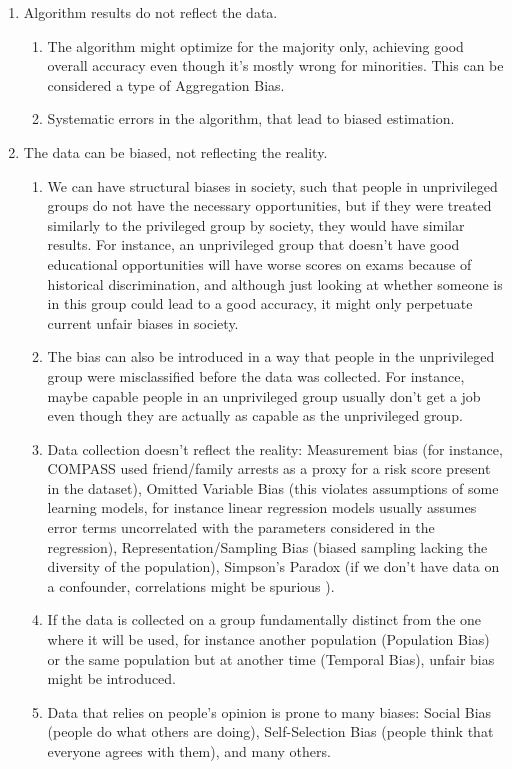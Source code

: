 \documentclass[conference]{IEEEtran}
\begin{document}
\begin{enumerate}
\item Algorithm results do not reflect the data.
    \begin{enumerate}
    \item The algorithm might optimize for the majority only, achieving good overall accuracy even though it's mostly wrong for minorities. This can be considered a type of Aggregation Bias.
    \item Systematic errors in the algorithm, that lead to biased estimation.
    \end{enumerate}
\item The data can be biased, not reflecting the reality.
    \begin{enumerate}
    \item We can have structural biases in society, such that people in unprivileged groups do not have the necessary opportunities, but if they were treated similarly to the privileged group by society, they would have similar results. For instance, an unprivileged group that doesn't have good educational opportunities will have worse scores on exams because of historical discrimination, and although just looking at whether someone is in this group could lead to a good accuracy, it might only perpetuate current unfair biases in society.
    \item The bias can also be introduced in a way that people in the unprivileged group were misclassified before the data was collected. For instance, maybe capable people in an unprivileged group usually don't get a job even though they are actually as capable as the unprivileged group.
    \item Data collection doesn't reflect the reality: Measurement bias (for instance, COMPASS used friend/family arrests as a proxy for a risk score present in the dataset), Omitted Variable Bias (this violates assumptions of some learning models, for instance linear regression models usually assumes error terms uncorrelated with the parameters considered in the regression), Representation/Sampling Bias (biased sampling lacking the diversity of the population), Simpson's Paradox (if we don't have data on a confounder, correlations might be spurious \cite{Causality}).
    \item If the data is collected on a group fundamentally distinct from the one where it will be used, for instance another population (Population Bias) or the same population but at another time (Temporal Bias), unfair bias might be introduced.
    \item Data that relies on people's opinion is prone to many biases: Social Bias (people do what others are doing), Self-Selection Bias (people think that everyone agrees with them), and many others.

\end{enumerate}
\end{enumerate}
\end{document}
